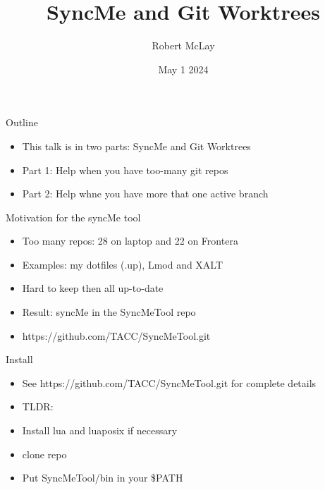 \documentclass{beamer}
\begin{document}
\title[SyncMe]{SyncMe and Git Worktrees}
\author{Robert McLay} 
\date{May 1 2024}

\frame{\titlepage} 


\begin{frame}{Outline}
  \begin{itemize}
    \item This talk is in two parts: SyncMe and Git Worktrees
    \item Part 1: Help when you have too-many git repos
    \item Part 2: Help whne you have more that one active branch
  \end{itemize}
\end{frame}

\begin{frame}{Motivation for the syncMe tool }
  \begin{itemize}
    \item Too many repos: 28 on laptop and 22 on Frontera
    \item Examples: my dotfiles (.up), Lmod and XALT
    \item Hard to keep then all up-to-date
    \item Result: syncMe in the SyncMeTool repo
    \item https://github.com/TACC/SyncMeTool.git
  \end{itemize}
\end{frame}

\begin{frame}{Install}
  \begin{itemize}
    \item See https://github.com/TACC/SyncMeTool.git for complete details
    \item TLDR:
    \item Install lua and luaposix if necessary
    \item clone repo
    \item Put SyncMeTool/bin in your \$PATH
  \end{itemize}
\end{frame}
\end{document}
